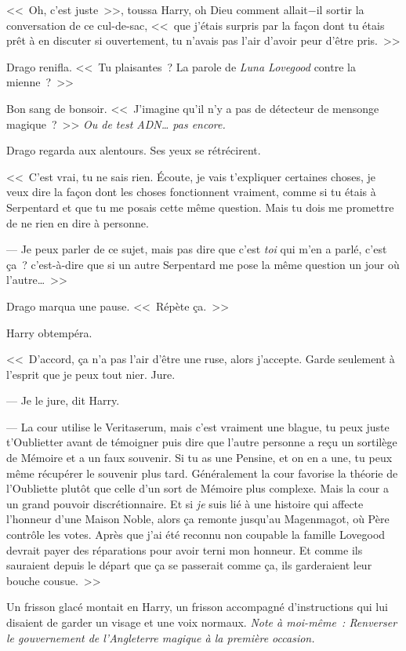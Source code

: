 <<~Oh, c'est juste~>>, toussa Harry, oh Dieu comment allait−il sortir la conversation de ce cul-de-sac, <<~que j'étais surpris par la façon dont tu étais prêt à en discuter si ouvertement, tu n'avais pas l'air d'avoir peur d'être pris.~>>

Drago renifla. <<~Tu plaisantes~? La parole de \emph{Luna Lovegood} contre la mienne~?~>>

Bon sang de bonsoir. <<~J'imagine qu'il n'y a pas de détecteur de mensonge magique~?~>> \emph{Ou de test ADN… pas encore.}

Drago regarda aux alentours. Ses yeux se rétrécirent.

<<~C'est vrai, tu ne sais rien. Écoute, je vais t'expliquer certaines choses, je veux dire la façon dont les choses fonctionnent vraiment, comme si tu étais à Serpentard et que tu me posais cette même question. Mais tu dois me promettre de ne rien en dire à personne.

--- Je peux parler de ce sujet, mais pas dire que c'est \emph{toi} qui m'en a parlé, c'est ça~? c'est-à-dire que si un autre Serpentard me pose la même question un jour où l'autre…~>>

Drago marqua une pause. <<~Répète ça.~>>

Harry obtempéra.

<<~D'accord, ça n'a pas l'air d'être une ruse, alors j'accepte. Garde seulement à l'esprit que je peux tout nier. Jure.

--- Je le jure, dit Harry.

--- La cour utilise le Veritaserum, mais c'est vraiment une blague, tu peux juste t'Oublietter avant de témoigner puis dire que l'autre personne a reçu un sortilège de Mémoire et a un faux souvenir. Si tu as une Pensine, et on en a une, tu peux même récupérer le souvenir plus tard. Généralement la cour favorise la théorie de l'Oubliette plutôt que celle d'un sort de Mémoire plus complexe. Mais la cour a un grand pouvoir discrétionnaire. Et si \emph{je} suis lié à une histoire qui affecte l'honneur d'une Maison Noble, alors ça remonte jusqu'au Magenmagot, où Père contrôle les votes. Après que j'ai été reconnu non coupable la famille Lovegood devrait payer des réparations pour avoir terni mon honneur. Et comme ils sauraient depuis le départ que ça se passerait comme ça, ils garderaient leur bouche cousue.~>>

Un frisson glacé montait en Harry, un frisson accompagné d'instructions qui lui disaient de garder un visage et une voix normaux. \emph{Note à moi-même~: Renverser le gouvernement de l'Angleterre magique à la première occasion.}

